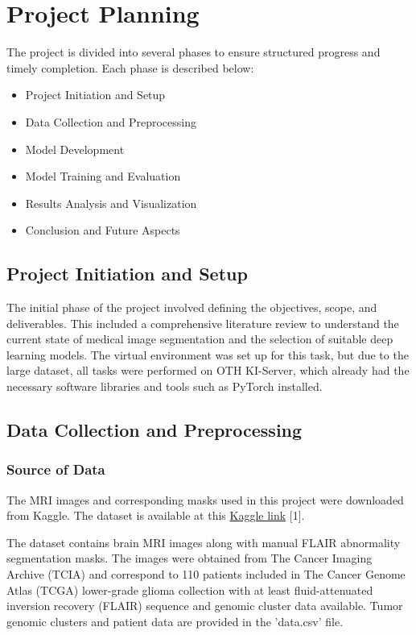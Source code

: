 \documentclass[11pt,a4paper]{article}
\begin{document}
\section{Project Planning}
\raggedright
The project is divided into several phases to ensure structured progress and timely completion. Each phase is described below:

\begin{itemize}
    \item Project Initiation and Setup
    \item Data Collection and Preprocessing
    \item Model Development
    \item Model Training and Evaluation
    \item Results Analysis and Visualization
    \item Conclusion and Future Aspects
\end{itemize}

\subsection{Project Initiation and Setup}
The initial phase of the project involved defining the objectives, scope, and deliverables. This included a comprehensive literature review to understand the current state of medical image segmentation and the selection of suitable deep learning models. The virtual environment was set up for this task, but due to the large dataset, all tasks were performed on OTH KI-Server, which already had the necessary software libraries and tools such as PyTorch installed.

\subsection{Data Collection and Preprocessing}
\subsubsection{Source of Data}
The MRI images and corresponding masks used in this project were downloaded from Kaggle. The dataset is available at this \href{https://www.kaggle.com/}{Kaggle link} [1].

The dataset contains brain MRI images along with manual FLAIR abnormality segmentation masks. The images were obtained from The Cancer Imaging Archive (TCIA) and correspond to 110 patients included in The Cancer Genome Atlas (TCGA) lower-grade glioma collection with at least fluid-attenuated inversion recovery (FLAIR) sequence and genomic cluster data available. Tumor genomic clusters and patient data are provided in the 'data.csv' file.
\end{document}
